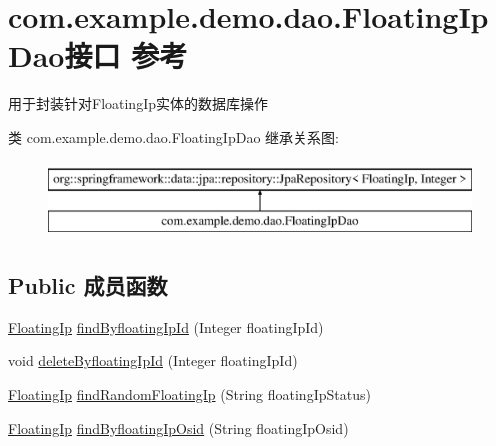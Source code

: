 \hypertarget{interfacecom_1_1example_1_1demo_1_1dao_1_1_floating_ip_dao}{}\section{com.\+example.\+demo.\+dao.\+Floating\+Ip\+Dao接口 参考}
\label{interfacecom_1_1example_1_1demo_1_1dao_1_1_floating_ip_dao}


用于封装针对\+Floating\+Ip实体的数据库操作  


类 com.\+example.\+demo.\+dao.\+Floating\+Ip\+Dao 继承关系图\+:\begin{figure}[H]
\begin{center}
\leavevmode
\includegraphics[height=2.000000cm]{interfacecom_1_1example_1_1demo_1_1dao_1_1_floating_ip_dao}
\end{center}
\end{figure}
\subsection*{Public 成员函数}
\begin{DoxyCompactItemize}
\item 
\mbox{\hyperlink{classcom_1_1example_1_1demo_1_1modular_1_1_floating_ip}{Floating\+Ip}} \mbox{\hyperlink{interfacecom_1_1example_1_1demo_1_1dao_1_1_floating_ip_dao_ae12bdb019a70c09f63e80343477933e8}{find\+Byfloating\+Ip\+Id}} (Integer floating\+Ip\+Id)
\item 
void \mbox{\hyperlink{interfacecom_1_1example_1_1demo_1_1dao_1_1_floating_ip_dao_a26810268c51c8056f9b7be4cfbb95d3e}{delete\+Byfloating\+Ip\+Id}} (Integer floating\+Ip\+Id)
\item 
\mbox{\hyperlink{classcom_1_1example_1_1demo_1_1modular_1_1_floating_ip}{Floating\+Ip}} \mbox{\hyperlink{interfacecom_1_1example_1_1demo_1_1dao_1_1_floating_ip_dao_a39f612808e5425d52f0dd47b2d134600}{find\+Random\+Floating\+Ip}} (String floating\+Ip\+Status)
\item 
\mbox{\hyperlink{classcom_1_1example_1_1demo_1_1modular_1_1_floating_ip}{Floating\+Ip}} \mbox{\hyperlink{interfacecom_1_1example_1_1demo_1_1dao_1_1_floating_ip_dao_a7508361dd368d6f77f0097bd46dfa3fb}{find\+Byfloating\+Ip\+Osid}} (String floating\+Ip\+Osid)
\end{DoxyCompactItemize}


